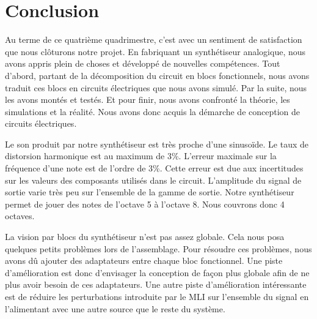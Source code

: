 \chapter{Conclusion}
Au terme de ce quatrième quadrimestre, c'est avec un sentiment de satisfaction
que nous clôturons notre projet. En fabriquant un synthétiseur analogique,
nous avons appris plein de choses et développé de nouvelles compétences.
Tout d'abord, partant de la décomposition du circuit en blocs fonctionnels,
nous avons traduit ces blocs en circuits électriques que nous avons simulé.
Par la suite, nous les avons montés et testés. Et pour finir, nous avons confronté
la théorie, les simulations et la réalité. Nous avons donc acquis la démarche de
conception de circuits électriques.

Le son produit par notre synthétiseur est très proche d'une sinusoïde. Le taux de
distorsion harmonique est au maximum de 3\%. L'erreur maximale sur la fréquence
d'une note est de l'ordre de 3\%. Cette erreur est due aux incertitudes sur les
valeurs des composants utilisés dans le circuit.
L'amplitude du signal de sortie varie très peu sur l'ensemble de la gamme de sortie.
Notre synthétiseur permet de jouer des notes de l'octave 5 à l'octave 8. 
Nous couvrons donc 4 octaves.

La vision par blocs du synthétiseur n'est pas assez globale. Cela nous posa
quelques petits problèmes lors de l'assemblage. Pour résoudre ces problèmes, 
nous avons dû ajouter des adaptateurs entre chaque bloc fonctionnel. Une piste
d'amélioration est donc d'envisager la conception de façon plus globale afin
de ne plus avoir besoin de ces adaptateurs. Une autre piste d'amélioration intéressante
est de réduire les perturbations introduite par le MLI sur l'ensemble du signal en 
l'alimentant avec une autre source que le reste du système.